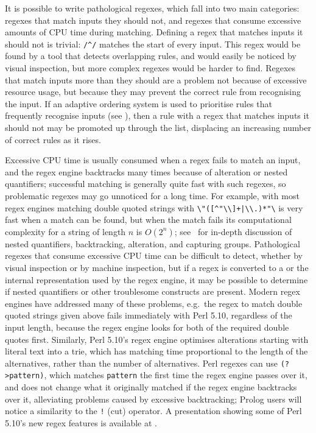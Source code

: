 It is possible to write pathological regexes, which fall into two main
categories: regexes that match inputs they should not, and regexes that
consume excessive amounts of CPU time during matching.  Defining a regex
that matches inputs it should not is trivial: \verb!/^/! matches the start
of every input.  This regex would be found by a tool that detects
overlapping rules, and would easily be noticed by visual inspection, but
more complex regexes would be harder to find.  Regexes that match inputs
more than they should are a problem not because of excessive resource
usage, but because they may prevent the correct rule from recognising the
input.  If an adaptive ordering system is used to prioritise rules that
frequently recognise inputs (see ), then a rule with a regex that matches inputs it should not
may be promoted up through the list, displacing an increasing number of
correct rules as it rises.

Excessive CPU time is usually consumed when a regex fails to match an
input, and the regex engine backtracks many times because of alteration or
nested quantifiers; successful matching is generally quite fast with such
regexes, so problematic regexes may go unnoticed for a long time.  For
example, with most regex engines matching double quoted strings with
\verb!\"([^"\\]+|\\.)*"\!  is very fast when a match can be found, but when
the match fails its computational complexity for a string of length $n$ is
$O(2^{n})$; see~\cite{mastering-regular-expressions} for in-depth
discussion of nested quantifiers, backtracking, alteration, and capturing
groups.  Pathological regexes that consume excessive CPU time can be
difficult to detect, whether by visual inspection or by machine inspection,
but if a regex is converted to a  or the internal
representation used by the regex engine, it may be possible to determine if
nested quantifiers or other troublesome constructs are present.  Modern
regex engines have addressed many of these problems, e.g.\ the regex to
match double quoted strings given above fails immediately with Perl 5.10,
regardless of the input length, because the regex engine looks for both of
the required double quotes first.  Similarly, Perl 5.10's regex engine
optimises alterations starting with literal text into a trie, which has
matching time proportional to the length of the alternatives, rather than
the number of alternatives.  Perl regexes can use \verb!(?>pattern)!, which
matches \verb!pattern! the first time the regex engine passes over it, and
does not change what it originally matched if the regex engine backtracks
over it, alleviating problems caused by excessive backtracking; Prolog
users will notice a similarity to the \verb'!' (cut) operator.  A
presentation showing some of Perl 5.10's new regex features is available at
.

